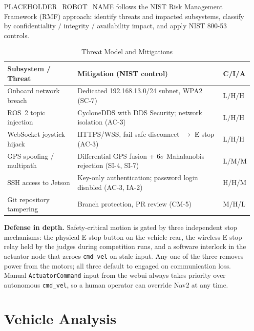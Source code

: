 \documentclass[11pt, letterpaper]{article}
\newcommand{\robotname}{PLACEHOLDER\_ROBOT\_NAME}
\begin{document}
\robotname{} follows the NIST Risk Management Framework (RMF) approach: identify threats
and impacted subsystems, classify by confidentiality / integrity / availability impact, and
apply NIST 800-53 controls.

\begin{table}[H]
    \centering
    \small
    \caption{Threat Model and Mitigations}
    \begin{tabularx}{\textwidth}{l X l}
        \toprule
        \textbf{Subsystem / Threat} & \textbf{Mitigation (NIST control)} & \textbf{C/I/A} \\
        \midrule
        Onboard network breach & Dedicated 192.168.13.0/24 subnet, WPA2 (SC-7) & L/H/H \\
        ROS~2 topic injection & CycloneDDS with DDS Security; network isolation (AC-3) & L/H/H \\
        WebSocket joystick hijack & HTTPS/WSS, fail-safe disconnect $\to$ E-stop (AC-3) & L/H/H \\
        GPS spoofing / multipath & Differential GPS fusion + 6$\sigma$ Mahalanobis rejection (SI-4, SI-7) & L/M/M \\
        SSH access to Jetson & Key-only authentication; password login disabled (AC-3, IA-2) & H/H/M \\
        Git repository tampering & Branch protection, PR review (CM-5) & M/H/L \\
        \bottomrule
    \end{tabularx}
\end{table}

\textbf{Defense in depth.} Safety-critical motion is gated by three independent stop
mechanisms: the physical E-stop button on the vehicle rear, the wireless E-stop relay held
by the judges during competition runs, and a software interlock in the actuator node that
zeroes \texttt{cmd\_vel} on stale input. Any one of the three removes power from the motors;
all three default to engaged on communication loss. Manual \texttt{ActuatorCommand} input
from the webui always takes priority over autonomous \texttt{cmd\_vel}, so a human operator
can override Nav2 at any time.

\section{Vehicle Analysis}
\label{sec:safety}
\end{document}
